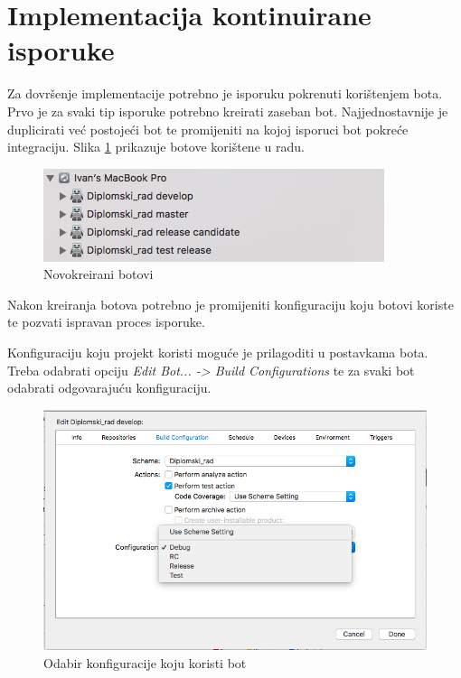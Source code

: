 \documentclass[times, utf8, diplomski, numeric]{fer}
\begin{document}
\section{Implementacija kontinuirane isporuke}

Za dovršenje implementacije potrebno je isporuku pokrenuti korištenjem bota. Prvo je za svaki tip isporuke potrebno kreirati zaseban bot. Najjednostavnije je duplicirati već postojeći bot te promijeniti na kojoj isporuci bot pokreće integraciju. Slika \ref{fig:MultipleBots} prikazuje botove korištene u radu.

\begin{figure}[b!]
\centering
\includegraphics[scale=0.7]{MultipleBots}
\caption{Novokreirani botovi}
\label{fig:MultipleBots}
\end{figure}

Nakon kreiranja botova potrebno je promijeniti konfiguraciju koju botovi koriste te pozvati ispravan proces isporuke.

Konfiguraciju koju projekt koristi moguće je prilagoditi u postavkama bota. Treba odabrati opciju \textit{Edit Bot... -> Build Configurations} te za svaki bot odabrati odgovarajuću konfiguraciju.

\begin{figure}
\centering
\includegraphics[scale=0.5]{BotConfiguration}
\caption{Odabir konfiguracije koju koristi bot}
\label{fig:BotConfiguration}
\end{figure}
\end{document}
